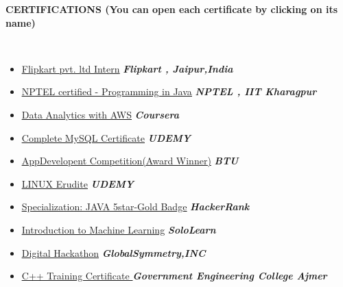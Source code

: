 \documentclass[a4paper,10pt]{article}
\newcommand{\resheading}[1]{{\small \colorbox{mygrey}{\begin{minipage}{0.99\textwidth}{\textbf{#1 \vphantom{p\^{E}}}}\end{minipage}}}}
\begin{document}
\noindent
\resheading{\textbf{CERTIFICATIONS (You can open each certificate by clicking on its name)}}\\[-0.3cm]
\begin{itemize}
    
     
     \item \href{https://drive.google.com/file/d/1ML4ZOAIljTuevwJwBSYPsFSOT4pzQhUj/view?usp=sharing}{\underline{Flipkart pvt. ltd Intern}} \hfill \textbf{\emph{Flipkart , Jaipur,India}}\\[-0.6cm]
     \item \href{https://drive.google.com/file/d/1SqDhJUddhnPJJmJIpbloYYzmFB5fbbay/view?usp=share_link}{\underline{NPTEL certified - Programming in Java}} \hfill \textbf{\emph{NPTEL , IIT Kharagpur}}\\[-0.6cm]
     \item \href{https://www.coursera.org/account/accomplishments/certificate/SXMDMZSTEVG6/}{\underline{Data Analytics with AWS}} \hfill \textbf{\emph{Coursera}}\\[-0.6cm]
     \item \href{https://www.udemy.com/certificate/UC-8c37fe99-33c9-49a8-91e6-3a22d56acb2d/}{\underline{Complete MySQL Certificate}} \hfill \textbf{\emph{UDEMY}}\\[-0.6cm]
     \item \href{}{\underline{AppDevelopent Competition(Award Winner)}} \hfill \textbf{\emph{BTU}}\\[-0.6cm]
     \item \href{https://www.udemy.com/certificate/UC-a9b62bc4-69c9-40d8-a297-0b45af2ca330/}{\underline{LINUX Erudite}} \hfill \textbf{\emph{UDEMY}}\\[-0.6cm]
     \item \href{https://www.hackerrank.com/anujtiwari1098}{\underline{Specialization: JAVA 5star-Gold Badge}} \hfill \textbf{\emph{HackerRank}}\\[-0.6cm]
     
     \item \href{https://drive.google.com/file/d/1obpzaRhSUReWC6b-wGx2Tb5RQQ425IYo/view?usp=sharing}{\underline{Introduction to Machine Learning}} \hfill \textbf{\emph{SoloLearn}}\\[-0.6cm]
      \item \href{https://drive.google.com/file/d/1m_qS7UoPG_MV3cVlsRds2qSXnGXbaPqa/view?usp=sharing}{\underline{Digital Hackathon}} \hfill \textbf{\emph{GlobalSymmetry,INC}}\\[-0.6cm]
     
      \item \href{https://drive.google.com/file/d/1DFnuYR8PiDrCpTRqSHitH2gxTAyKr9lf/view?usp=sharing}{\underline{C++ Training Certificate }} \hfill \textbf{\emph{Government Engineering College Ajmer}}\\[-0.6cm]
    
\end{itemize}
\end{document}

